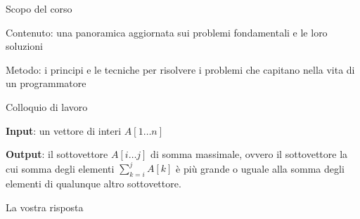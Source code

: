 \begin{frame}{Scopo del corso}
\begin{myboxtitle}
\BI
\item \alert{Contenuto}: una panoramica aggiornata sui problemi fondamentali e le loro soluzioni
\item	\alert{Metodo}: i principi e le tecniche per risolvere i problemi che capitano nella vita di un programmatore
\EI
\end{myboxtitle}
\end{frame}


\begin{frame}{Colloquio di lavoro}
	
\vspace{-9pt}
\begin{myboxtitle}
\BI
\item \textbf{Input}: un vettore di interi $A[1 \ldots n]$
\item \textbf{Output}: il sottovettore $A[i \ldots j]$ di somma massimale,
ovvero il sottovettore la cui somma degli elementi $\sum_{k=i}^j A[k]$ è
più grande o uguale alla somma degli elementi di qualunque altro sottovettore.
\EI
\end{myboxtitle}
\end{frame}


\begin{frame}{La vostra risposta}


\end{frame}


